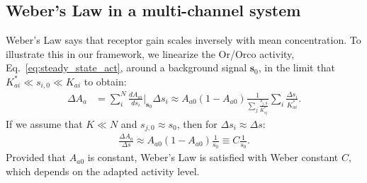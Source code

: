 \documentclass[9pt,twoside,lineno]{pnas-new}
\begin{document}
\subsection*{Weber's Law in a multi-channel system}
Weber's Law says that receptor gain scales inversely with mean concentration. To illustrate this in our framework, we linearize the Or/Orco activity, Eq.~\ref{eq:steady_state_act}, around a background signal $\mathbf s_0$, in the limit that $K^*_{ai} \ll s_{i, 0} \ll K_{ai}$ to obtain:
\begin{align}
    \Delta A_a &= 
    \sum_i^N\frac{dA_{ai}}{ds_i}\bigg|_{\mathbf s_0}\Delta s_i \approx A_{a0}(1 - A_{a0})\frac{1}{\sum_j\frac{s_{j, 0}}{K^*_{aj}}}\sum_i\frac{\Delta s_i}{K^*_{ai}}.
    \label{eq:WL_gain_no_approx}
\end{align}
If we assume that $K \ll N$ and $s_{j, 0} \approx s_0$, then for $\Delta s_i \approx \Delta s$:
\begin{align}
    \frac{\Delta A_a}{\Delta s} 
    \approx A_{a0}(1 - A_{a0})\frac{1}{s_0}
    \equiv C\frac{1}{s_0}.
    \label{eq:WL_gain}
\end{align}
Provided that $A_{a0}$ is constant, Weber's Law is satisfied with Weber constant $C$, which depends on the adapted activity level. %
\end{document}
